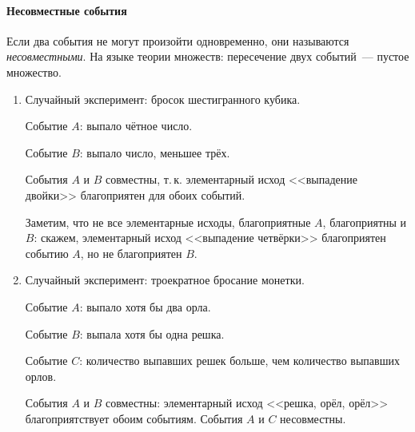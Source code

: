 \documentclass[11pt]{article}
\begin{document}
\paragraph{Несовместные события} Если два события не могут произойти одновременно, они называются \emph{несовместными}. На языке теории множеств: пересечение двух событий~--- пустое множество.

\begin{center}
\end{center}

\begin{examples}
\item[]
\begin{enumerate}
	\item Случайный эксперимент: бросок шестигранного кубика.
	
	Событие $A$: выпало чётное число.
	
	Событие $B$: выпало число, меньшее трёх.
	
	События $A$ и $B$ совместны, т.\,к. элементарный исход <<выпадение двойки>> благоприятен для обоих событий. 
	
	Заметим, что не все элементарные исходы, благоприятные $A$, благоприятны и $B$: скажем, элементарный исход <<выпадение четвёрки>> благоприятен событию $A$, но не благоприятен $B$.

	\item Случайный эксперимент: троекратное бросание монетки.
	
	Событие $A$: выпало хотя бы два орла.
	
	Событие $B$: выпала хотя бы одна решка.
	
	Событие $C$: количество выпавших решек больше, чем количество выпавших орлов.
	
	События $A$ и $B$ совместны: элементарный исход <<решка, орёл, орёл>> благоприятствует обоим событиям. События $A$ и $C$ несовместны.
\end{enumerate}
\end{examples}
\end{document}
